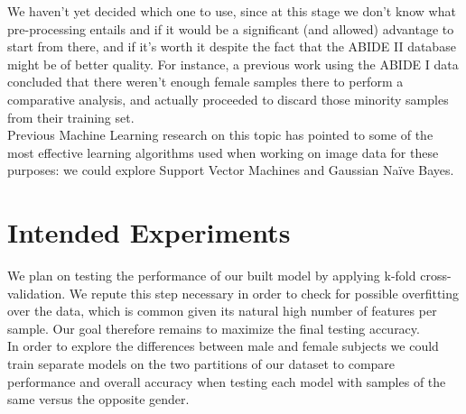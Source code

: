 \documentclass{article}
\begin{document}
We haven’t yet decided which one to use, since at this stage we don’t know what pre-processing entails and if it would be a significant (and allowed) advantage to start from there, and if it’s worth it despite the fact that the ABIDE II database might be of better quality. For instance, a previous work \cite{guidelinesml} using the ABIDE I data concluded that there weren’t enough female samples there to perform a comparative analysis, and actually proceeded to discard those minority samples from their training set.\\

Previous Machine Learning research on this topic\cite{guidelinesml} has pointed to some of the most effective learning algorithms used when working on image data for these purposes: we could explore Support Vector Machines and Gaussian Naïve Bayes.\\

\cleardoublepage
\section{Intended Experiments}


We plan on testing the performance of our built model by applying k-fold cross-validation.
We repute this step necessary in order to check for possible overfitting over the data, which is common given its natural high number of features per sample.  Our goal therefore remains to maximize the final testing accuracy.\\

In order to explore the differences between male and female subjects we could train separate models on the two partitions of our dataset to compare performance and overall accuracy when testing each model with samples of the same versus the opposite gender.





\cleardoublepage
\end{document}
